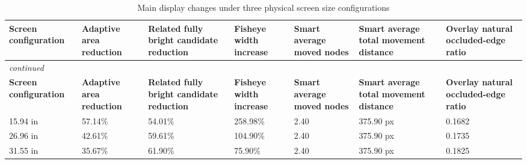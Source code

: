 \documentclass[11pt,a4paper,oneside,extrafontsizes]{memoir}
\begin{document}
\begin{center}

\begin{longtable}{@{}p{} p{} p{} p{} p{} p{} p{}@{}}
\caption{Main display changes under three physical screen size configurations}\label{tab:screen-size-results}\\
\toprule
\textbf{Screen configuration} & \textbf{Adaptive area reduction} & \textbf{Related fully bright candidate reduction} & \textbf{Fisheye width increase} & \textbf{Smart average moved nodes} & \textbf{Smart average total movement distance} & \textbf{Overlay natural occluded-edge ratio} \\
\midrule
\endfirsthead
\multicolumn{7}{l}{\itshape continued}\\
\toprule
\textbf{Screen configuration} & \textbf{Adaptive area reduction} & \textbf{Related fully bright candidate reduction} & \textbf{Fisheye width increase} & \textbf{Smart average moved nodes} & \textbf{Smart average total movement distance} & \textbf{Overlay natural occluded-edge ratio} \\
\midrule
\endhead
15.94 in & 57.14\% & 54.01\% & 258.98\% & 2.40 & 375.90 px & 0.1682 \\
26.96 in & 42.61\% & 59.61\% & 104.90\% & 2.40 & 375.90 px & 0.1735 \\
31.55 in & 35.67\% & 61.90\% & 75.90\% & 2.40 & 375.90 px & 0.1825 \\
\bottomrule
\end{longtable}


\end{center}
\end{document}
